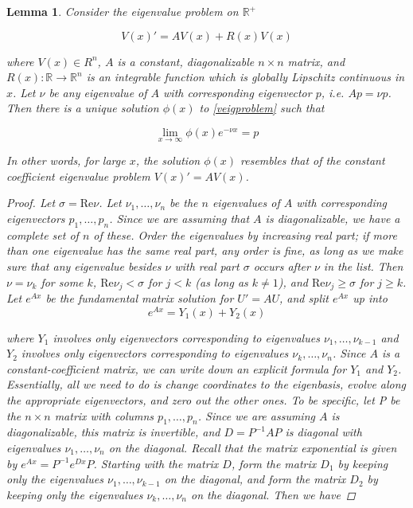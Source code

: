 \documentclass[12pt]{article}
\def\R{{\mathbb R}}
\newtheorem{lemma}{Lemma}
\begin{document}
\begin{lemma}\label{1devolpos}
Consider the eigenvalue problem on $\R^+$

\begin{equation}\label{veigproblem}
V(x)' = AV(x) + R(x)V(x)
\end{equation}

where $V(x) \in R^n$, $A$ is a constant, diagonalizable $n \times n$ matrix, and $R(x): \R \rightarrow \R^n$ is an integrable function which is globally Lipschitz continuous in $x$. Let $\nu$ be any eigenvalue of $A$ with corresponding eigenvector $p$, i.e. $A p = \nu p$. Then there is a unique solution $\phi(x)$ to \eqref{veigproblem} such that 

\[
\lim_{x\rightarrow\infty} \phi(x) e^{-\nu x} = p
\]

In other words, for large $x$, the solution $\phi(x)$ resembles that of the constant coefficient eigenvalue problem $V(x)' = AV(x)$.

\begin{proof}
Let $\sigma = \text{Re} \nu$. Let $\nu_1, \dots, \nu_n$ be the $n$ eigenvalues of $A$ with corresponding eigenvectors $p_1, \dots, p_n$. Since we are assuming that $A$ is diagonalizable, we have a complete set of $n$ of these. Order the eigenvalues by increasing real part; if more than one eigenvalue has the same real part, any order is fine, as long as we make sure that any eigenvalue besides $\nu$ with real part $\sigma$ occurs after $\nu$ in the list. Then $\nu = \nu_k$ for some $k$, $\text{Re} \nu_j < \sigma$ for $j < k$ (as long as $k \neq 1$), and $\text{Re} \nu_j \geq \sigma$ for $j \geq k$. \\

Let $e^{Ax}$ be the fundamental matrix solution for $U' = A U$, and split $e^{Ax}$ up into
\[
e^{Ax} = Y_1(x) + Y_2(x)
\]

where $Y_1$ involves only eigenvectors corresponding to eigenvalues $\nu_1, \dots, \nu_{k-1}$ and $Y_2$ involves only eigenvectors corresponding to eigenvalues $\nu_{k}, \dots, \nu_n$. Since $A$ is a constant-coefficient matrix, we can write down an explicit formula for $Y_1$ and $Y_2$. Essentially, all we need to do is change coordinates to the eigenbasis, evolve along the appropriate eigenvectors, and zero out the other ones. To be specific, let P be the $n \times n$ matrix with columns $p_1, \dots, p_n$. Since we are assuming $A$ is diagonalizable, this matrix is invertible, and $D = P^{-1}AP$ is diagonal with eigenvalues $\nu_1, \dots, \nu_n$ on the diagonal. Recall that the matrix exponential is given by $e^{Ax} = P^{-1}e^{Dx}P$. Starting with the matrix $D$, form the matrix $D_1$ by keeping only the eigenvalues $\nu_1, \dots, \nu_{k-1}$ on the diagonal, and form the matrix $D_2$ by keeping only the eigenvalues $\nu_{k}, \dots, \nu_n$ on the diagonal. Then we have


\end{proof}
\end{lemma}
\end{document}
